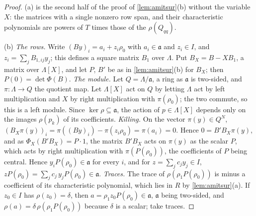 \begin{proof}
(a) is the second half of the proof of \cref{lem:amitsur}(b) without the variable $X$: the matrices with a single nonzero row span, and their characteristic polynomials are powers of $T$ times those of the $\rho(Q_{qq})$.

(b) \emph{The rows.} Write $(By)_i=a_i+z_i\rho_0$ with $a_i\in\mathfrak a$ and $z_i\in I$, and $z_i=\sum_jB_{1,ij}y_j$; this defines a square matrix $B_1$ over $\Lambda$. Put $B_X=B-XB_1$, a matrix over $\Lambda[X]$, and let $P$, $B'$ be as in
\cref{lem:amitsur}(b) for $B_X$; then $P(0)=\det\Phi(B)$. \emph{The module.} Let $Q=\Lambda/\mathfrak a$, a ring as $\mathfrak a$ is two-sided, and $\pi\colon\Lambda\to Q$ the quotient map. Let $\Lambda[X]$ act on $Q$ by letting $\Lambda$ act by left multiplication and $X$ by
right multiplication with $\pi(\rho_0)$; the two commute, so this is a left module. Since $\ker\rho\subseteq\mathfrak a$, the action of $p\in\Lambda[X]$ depends only on the images $\rho(p_k)$ of its coefficients. \emph{Killing.} On the vector $\pi(y)\in Q^N$,
$(B_X\pi(y))_i=\pi((By)_i)-\pi(z_i\rho_0)=\pi(a_i)=0$. Hence $0=B'B_X\pi(y)$, and as $\Phi_X(B'B_X)=P\cdot1$, the matrix $B'B_X$ acts on $\pi(y)$ as the scalar $P$, which acts by right multiplication with $\pi(P(\rho_0))$, the coefficients of
$P$ being central. Hence $y_iP(\rho_0)\in\mathfrak a$ for every $i$, and for $z=\sum_jc_jy_j\in I$, $zP(\rho_0)=\sum_jc_j\,y_jP(\rho_0)\in\mathfrak a$. \emph{Traces.} The trace of $\rho(\rho_1P(\rho_0))$ is minus a coefficient of its characteristic polynomial, which lies in $R$
by \cref{lem:amitsur}(a). If $z_0\in I$ has $\rho(z_0)=\delta$, then $a=\rho_1z_0P(\rho_0)\in\mathfrak a$, $\mathfrak a$ being two-sided, and $\rho(a)=\delta\,\rho(\rho_1P(\rho_0))$ because $\delta$ is a scalar; take traces.


\end{proof}
